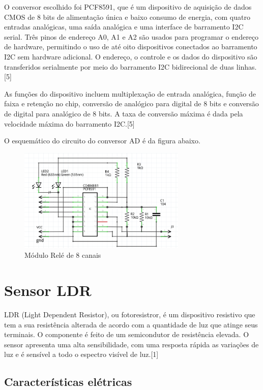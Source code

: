 O conversor escolhido foi PCF8591, que é um dispositivo de aquisição de dados CMOS de 8 bits de alimentação única e baixo consumo de energia, com quatro entradas analógicas, uma saída analógica e uma interface de barramento I2C serial. Três pinos de endereço A0, A1 e A2 são usados para programar o endereço de hardware, permitindo o uso de até oito dispositivos conectados ao barramento I2C sem hardware adicional. O endereço, o controle e os dados do dispositivo são transferidos serialmente por meio do barramento I2C bidirecional de duas linhas.[5]

As funções do dispositivo incluem multiplexação de entrada analógica, função de faixa e retenção no chip, conversão de analógico para digital de 8 bits e conversão de digital para analógico de 8 bits. A taxa de conversão máxima é dada pela velocidade máxima do barramento I2C.[5]

O esquemático do circuito do conversor AD é da figura abaixo.

\begin{figure}[H]
	\centering
	\includegraphics[width=8cm]{figuras/circuito_1.png}
	\caption{Módulo Relé de 8 canais} \label{circuito_1}
\end{figure}


\section{Sensor LDR}

LDR (Light Dependent Resistor), ou fotoresistror, é um dispositivo resistivo que tem a sua resistência alterada de acordo com a quantidade de luz que atinge seus terminais. O componente é feito de um semicondutor de resistência elevada. O sensor apresenta uma alta sensibilidade, com uma resposta rápida as variações de luz e é sensível a todo o espectro visível de luz.[1]

\subsection{Características elétricas}

